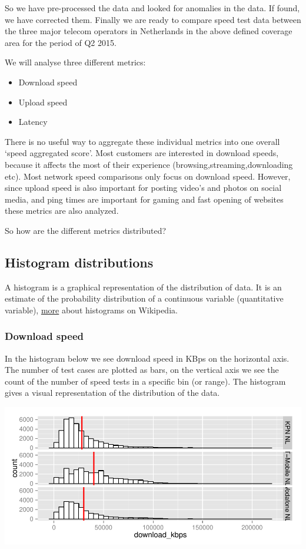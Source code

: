 \documentclass[]{article}
\begin{document}
So we have pre-processed the data and looked for anomalies in the data.
If found, we have corrected them. Finally we are ready to compare speed
test data between the three major telecom operators in Netherlands in
the above defined coverage area for the period of Q2 2015.

We will analyse three different metrics:

\begin{itemize}
\itemsep1pt\parskip0pt
\item
  Download speed
\item
  Upload speed
\item
  Latency
\end{itemize}

There is no useful way to aggregate these individual metrics into one
overall `speed aggregated score'. Most customers are interested in
download speeds, because it affects the most of their experience
(browsing,streaming,downloading etc). Most network speed comparisons
only focus on download speed. However, since upload speed is also
important for posting video's and photos on social media, and ping times
are important for gaming and fast opening of websites these metrics are
also analyzed.

So how are the different metrics distributed?

\subsection{Histogram distributions}\label{histogram-distributions}

A histogram is a graphical representation of the distribution of data.
It is an estimate of the probability distribution of a continuous
variable (quantitative variable),
\href{https://en.wikipedia.org/wiki/Histogram}{more} about histograms on
Wikipedia.

\subsubsection{Download speed}\label{download-speed}

In the histogram below we see download speed in KBps on the horizontal
axis. The number of test cases are plotted as bars, on the vertical axis
we see the count of the number of speed tests in a specific bin (or
range). The histogram gives a visual representation of the distribution
of the data.

\includegraphics{speedtest-analysis_files/figure-latex/downloadspeed-1.pdf}
\end{document}
